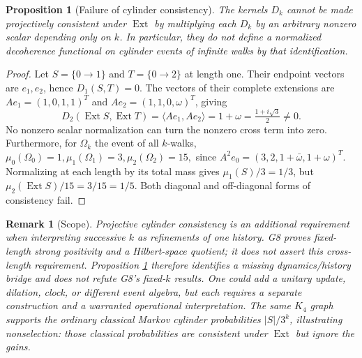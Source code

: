 \documentclass[11pt]{article}
\newtheorem{proposition}[theorem]{Proposition}
\newtheorem{remark}[theorem]{Remark}
\newcommand{\Ext}{\operatorname{Ext}}
\begin{document}
\begin{proposition}[Failure of cylinder consistency]\label{prop:consistency}
The kernels $D_k$ cannot be made projectively consistent under $\Ext$ by multiplying each $D_k$ by an arbitrary nonzero scalar depending only on $k$. In particular, they do not define a normalized decoherence functional on cylinder events of infinite walks by that identification.
\end{proposition}
\begin{proof}
Let $S=\{0\to1\}$ and $T=\{0\to2\}$ at length one. Their endpoint vectors are $e_1,e_2$, hence $D_1(S,T)=0$. The vectors of their complete extensions are $Ae_1=(1,0,1,1)^T$ and $Ae_2=(1,1,0,\omega)^T$, giving
\begin{equation}
D_2(\Ext S,\Ext T)=\langle Ae_1,Ae_2\rangle=1+\omega=\tfrac{1+i\sqrt 3}{2}\ne0.
\end{equation}
No nonzero scalar normalization can turn the nonzero cross term into zero. Furthermore, for $\Omega_k$ the event of all $k$-walks,
\(\mu_0(\Omega_0)=1,\mu_1(\Omega_1)=3,\mu_2(\Omega_2)=15,\)
since $A^2e_0=(3,2,1+\bar\omega,1+\omega)^T$. Normalizing at each length by its total mass gives $\mu_1(S)/3=1/3$, but $\mu_2(\Ext S)/15=3/15=1/5$. Both diagonal and off-diagonal forms of consistency fail.
\end{proof}
\begin{remark}[Scope]
Projective cylinder consistency is an \emph{additional requirement} when interpreting successive $k$ as refinements of one history. G8 proves fixed-length strong positivity and a Hilbert-space quotient; it does not assert this cross-length requirement. Proposition \ref{prop:consistency} therefore identifies a missing dynamics/history bridge and does \emph{not} refute G8's fixed-$k$ results. One could add a unitary update, dilation, clock, or different event algebra, but each requires a separate construction and a warranted operational interpretation. The same $K_4$ graph supports the ordinary classical Markov cylinder probabilities $|S|/3^k$, illustrating nonselection: those classical probabilities \emph{are} consistent under $\Ext$ but ignore the gains.
\end{remark}
\end{document}
